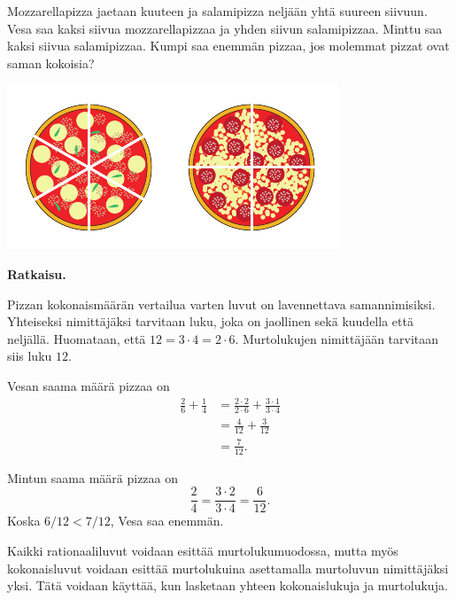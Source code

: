     \begin{esimerkki}
        Mozzarellapizza jaetaan kuuteen ja salamipizza neljään yhtä suureen
        siivuun. Vesa saa kaksi siivua mozzarellapizzaa ja yhden siivun salamipizzaa.
        Minttu saa kaksi siivua salamipizzaa. Kumpi saa enemmän pizzaa, jos
        molemmat pizzat ovat saman kokoisia?
        
        \begin{center}        
          \includegraphics[scale=1.0]{pictures/Kuva3-1-6-pizzat.pdf}
        \end{center}

        \textbf{Ratkaisu.}
        
        Pizzan kokonaismäärän vertailua varten luvut on lavennettava samannimisiksi.
        Yhteiseksi nimittäjäksi tarvitaan luku, joka on jaollinen sekä kuudella että neljällä.
        Huomataan, että $12 = 3\cdot 4 = 2\cdot 6$. Murtolukujen nimittäjään tarvitaan siis luku $12$.
        
        Vesan saama määrä pizzaa on
        \begin{align*}
           \frac{2}{6} + \frac{1}{4} &= \frac{2\cdot 2}{2\cdot 6} + \frac{3\cdot 1}{3\cdot 4} \\ 
	       							 &= \frac{4}{12}+\frac{3}{12} \\ 
	       							 &= \frac{7}{12}.
        \end{align*}
        
        Mintun saama määrä pizzaa on
        \[
            \frac{2}{4} =
            \frac{3\cdot 2}{3\cdot 4} =
            \frac{6}{12}.
        \]
        Koska $6/12 < 7/12$, Vesa saa enemmän.
    \end{esimerkki}
    
    Kaikki rationaaliluvut voidaan esittää murtolukumuodossa, mutta myös
    kokonaisluvut voidaan esittää murtolukuina asettamalla murtoluvun
    nimittäjäksi yksi. Tätä voidaan käyttää, kun lasketaan yhteen
    kokonaislukuja ja murtolukuja.
    
